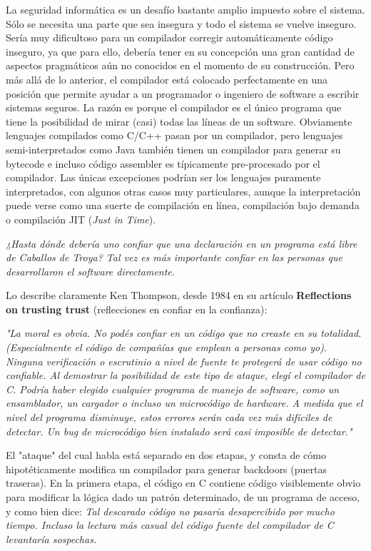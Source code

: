 La seguridad informática es un desafío bastante amplio impuesto sobre el sistema. Sólo se necesita una parte que sea insegura y todo el sistema se vuelve inseguro. Sería muy dificultoso para un compilador corregir automáticamente código inseguro, ya que para ello, debería tener en su concepción una gran cantidad de aspectos pragmáticos aún no conocidos en el momento de su construcción. Pero más allá de lo anterior, el compilador está colocado perfectamente en una posición que permite ayudar a un programador o ingeniero de software a escribir sistemas seguros. La razón es porque el compilador es el único programa que tiene la posibilidad de mirar (casi) todas las líneas de un software. Obviamente lenguajes compilados como C/C++ pasan por un compilador, pero lenguajes semi-interpretados como Java también tienen un compilador para generar su bytecode e incluso código assembler es típicamente pre-procesado por el compilador. Las únicas excepciones podrían ser los lenguajes puramente interpretados, con algunos otras casos muy particulares\cite{secenhancedcompilers}, aunque la interpretación puede verse como una suerte de compilación en línea, compilación bajo demanda o compilación JIT (\textit{Just in Time})\cite{bolc2012design}\cite{mak2011writing}.

\textit{¿Hasta dónde debería uno confiar que una declaración en un programa está libre de Caballos de Troya? Tal vez es más importante confiar en las personas que desarrollaron el software directamente.}

Lo describe claramente Ken Thompson, desde 1984 en su artículo \textbf{Reflections on trusting trust} (reflecciones en confiar en la confianza):
\begin{displayquote}
    \textit{"La moral es obvia. No podés confiar en un código que no creaste en su totalidad. (Especialmente el código de compañías que emplean a personas como yo). Ninguna verificación o escrutinio a nivel de fuente te protegerá de usar código no confiable. Al demostrar la posibilidad de este tipo de ataque, elegí el compilador de C. Podría haber elegido cualquier programa de manejo de software, como un ensamblador, un cargador o incluso un microcódigo de hardware. A medida que el nivel del programa disminuye, estos errores serán cada vez más difíciles de detectar. Un bug de microcódigo bien instalado será casi imposible de detectar."}
\end{displayquote}

El "ataque" del cual habla está separado en dos etapas, y consta de cómo hipotéticamente modifica un compilador para generar backdoors (puertas traseras). En la primera etapa, el código en C contiene código visiblemente obvio para modificar la lógica dado un patrón determinado, de un programa de acceso, y como bien dice:
\textit{Tal descarado código no pasaría desapercibido por mucho tiempo. Incluso la lectura más casual del código fuente del compilador de C levantaría sospechas.}

